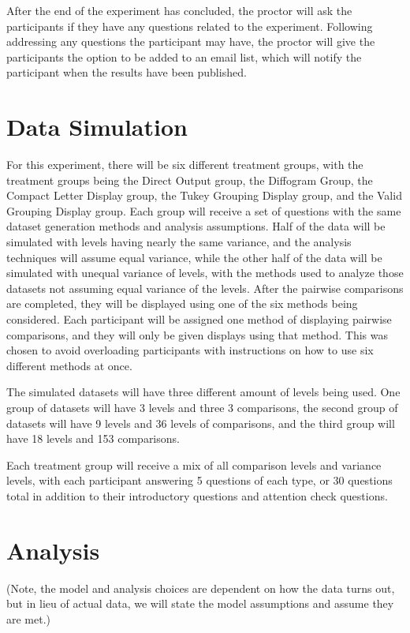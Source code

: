 \documentclass{article}
\begin{document}
After the end of the experiment has concluded, the proctor will ask the participants if they have any questions related to the experiment. Following addressing any questions the participant may have, the proctor will give the participants the option to be added to an email list, which will notify the participant when the results have been published. 

\section{Data Simulation}

For this experiment, there will be six different treatment groups, with the treatment groups being the Direct Output group, the Diffogram Group, the Compact Letter Display group, the Tukey Grouping Display group, and the Valid Grouping Display group. Each group will receive a set of questions with the same dataset generation methods and analysis assumptions. Half of the data will be simulated with levels having nearly the same variance, and the analysis techniques will assume equal variance, while the other half of the data will be simulated with unequal variance of levels, with the methods used to analyze those datasets not assuming equal variance of the levels. After the pairwise comparisons are completed, they will be displayed using one of the six methods being considered. Each participant will be assigned one method of displaying pairwise comparisons, and they will only be given displays using that method. This was chosen to avoid overloading participants with instructions on how to use six different methods at once. 

The simulated datasets will have three different amount of levels being used. One group of datasets will have 3 levels and three 3 comparisons, the second group of datasets will have 9 levels and 36 levels of comparisons, and the third group will have 18 levels and 153 comparisons.

Each treatment group will receive a mix of all comparison levels and variance levels, with each participant answering 5 questions of each type, or 30 questions total in addition to their introductory questions and attention check questions. 


\section{Analysis}

(Note, the model and analysis choices are dependent on how the data turns out, but in lieu of actual data, we will state the model assumptions and assume they are met.)
\end{document}
